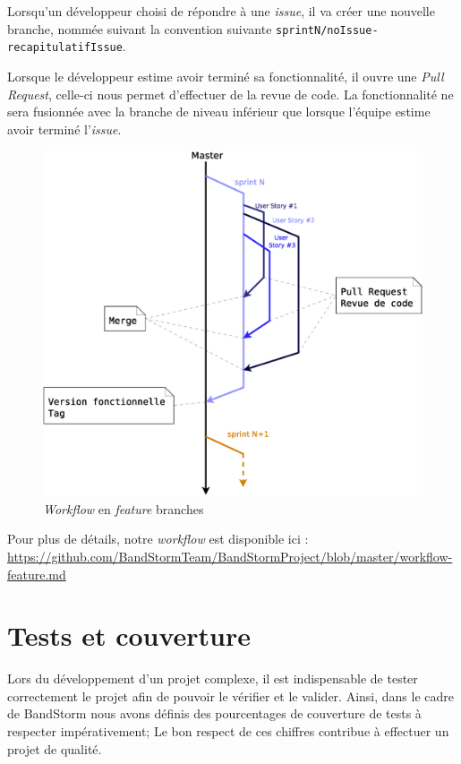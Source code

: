 \documentclass[12pt,a4paper,oneside]{book}
\begin{document}
	Lorsqu'un développeur choisi de répondre à une \textit{issue}, il va créer une nouvelle branche, nommée suivant la convention suivante
	\texttt{sprintN/noIssue-recapitulatifIssue}.
	
	Lorsque le développeur estime avoir terminé sa fonctionnalité, il ouvre une \textit{Pull Request}, celle-ci nous permet d'effectuer de la revue de code. La fonctionnalité ne sera fusionnée
	avec la branche de niveau inférieur que lorsque l'équipe estime avoir terminé l'\textit{issue}.
	\begin{figure}[H]
		\includegraphics[width=15.5cm]{../beamer/images/Process/BranchingWorkflow.eps}
		\caption{\textit{Workflow} en \textit{feature} branches}
	\end{figure}
	Pour plus de détails, notre \textit{workflow} est disponible ici
	: \newline
	\url{https://github.com/BandStormTeam/BandStormProject/blob/master/workflow-feature.md}
	
	\section{Tests et couverture}
	Lors du développement d'un projet complexe, il est indispensable de tester correctement le projet afin de pouvoir le vérifier et le valider. Ainsi, dans le cadre de BandStorm nous avons définis des pourcentages de couverture de tests à respecter impérativement; Le bon respect de ces chiffres contribue à effectuer un projet de qualité. 
	
\end{document}
